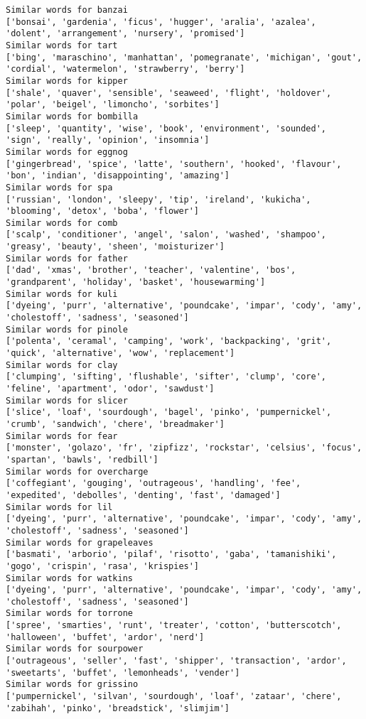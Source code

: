 \documentclass[11pt]{article}
\begin{document}
\begin{Verbatim}[commandchars=\\\{\}]
Similar words for banzai
['bonsai', 'gardenia', 'ficus', 'hugger', 'aralia', 'azalea', 'dolent', 'arrangement', 'nursery', 'promised']
Similar words for tart
['bing', 'maraschino', 'manhattan', 'pomegranate', 'michigan', 'gout', 'cordial', 'watermelon', 'strawberry', 'berry']
Similar words for kipper
['shale', 'quaver', 'sensible', 'seaweed', 'flight', 'holdover', 'polar', 'beigel', 'limoncho', 'sorbites']
Similar words for bombilla
['sleep', 'quantity', 'wise', 'book', 'environment', 'sounded', 'sign', 'really', 'opinion', 'insomnia']
Similar words for eggnog
['gingerbread', 'spice', 'latte', 'southern', 'hooked', 'flavour', 'bon', 'indian', 'disappointing', 'amazing']
Similar words for spa
['russian', 'london', 'sleepy', 'tip', 'ireland', 'kukicha', 'blooming', 'detox', 'boba', 'flower']
Similar words for comb
['scalp', 'conditioner', 'angel', 'salon', 'washed', 'shampoo', 'greasy', 'beauty', 'sheen', 'moisturizer']
Similar words for father
['dad', 'xmas', 'brother', 'teacher', 'valentine', 'bos', 'grandparent', 'holiday', 'basket', 'housewarming']
Similar words for kuli
['dyeing', 'purr', 'alternative', 'poundcake', 'impar', 'cody', 'amy', 'cholestoff', 'sadness', 'seasoned']
Similar words for pinole
['polenta', 'ceramal', 'camping', 'work', 'backpacking', 'grit', 'quick', 'alternative', 'wow', 'replacement']
Similar words for clay
['clumping', 'sifting', 'flushable', 'sifter', 'clump', 'core', 'feline', 'apartment', 'odor', 'sawdust']
Similar words for slicer
['slice', 'loaf', 'sourdough', 'bagel', 'pinko', 'pumpernickel', 'crumb', 'sandwich', 'chere', 'breadmaker']
Similar words for fear
['monster', 'golazo', 'fr', 'zipfizz', 'rockstar', 'celsius', 'focus', 'spartan', 'bawls', 'redbill']
Similar words for overcharge
['coffegiant', 'gouging', 'outrageous', 'handling', 'fee', 'expedited', 'debolles', 'denting', 'fast', 'damaged']
Similar words for lil
['dyeing', 'purr', 'alternative', 'poundcake', 'impar', 'cody', 'amy', 'cholestoff', 'sadness', 'seasoned']
Similar words for grapeleaves
['basmati', 'arborio', 'pilaf', 'risotto', 'gaba', 'tamanishiki', 'gogo', 'crispin', 'rasa', 'krispies']
Similar words for watkins
['dyeing', 'purr', 'alternative', 'poundcake', 'impar', 'cody', 'amy', 'cholestoff', 'sadness', 'seasoned']
Similar words for torrone
['spree', 'smarties', 'runt', 'treater', 'cotton', 'butterscotch', 'halloween', 'buffet', 'ardor', 'nerd']
Similar words for sourpower
['outrageous', 'seller', 'fast', 'shipper', 'transaction', 'ardor', 'sweetarts', 'buffet', 'lemonheads', 'vender']
Similar words for grissino
['pumpernickel', 'silvan', 'sourdough', 'loaf', 'zataar', 'chere', 'zabihah', 'pinko', 'breadstick', 'slimjim']

\end{Verbatim}
\end{document}
